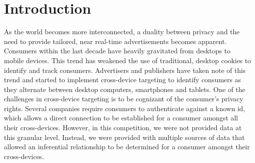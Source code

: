 \documentclass[9pt, journal]{IEEEtran}
\begin{document}
\maketitle


\IEEEdisplaynontitleabstractindextext


%


\section{Introduction}
As the world becomes more interconnected, a duality between privacy and the need to provide tailored, near real-time advertisements becomes apparent. 
Consumers within the last decade have heavily gravitated from desktops to mobile devices. 
This trend has weakened the use of traditional, desktop cookies to identify and track consumers. 
Advertisers and publishers have taken note of this trend and started to implement cross-device targeting to identify consumers as they alternate between desktop computers, smartphones and tablets. 
One of the challenges in cross-device targeting is to be cognizant of the consumer’s privacy rights. 
Several companies require consumers to authenticate against a known id, which allows a direct connection to be established for a consumer amongst all their cross-devices. 
However, in this competition, we were not provided data at this granular level. 
Instead, we were provided with multiple sources of data that allowed an inferential relationship to be determined for a consumer amongst their cross-devices. 
\end{document}
